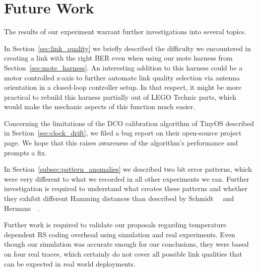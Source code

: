\newpage

\section*{Future Work}

The results of our experiment warrant further investigations into several topics.

In Section~\ref{sec:link_quality} we briefly described the difficulty we encountered in creating a link with the right \ac{BER} even when using our mote harness from Section~\ref{sec:mote_harness}.
An interesting addition to this harness could be a motor controlled z-axis to further automate link quality selection via antenna orientation in a closed-loop controller setup.
In that respect, it might be more practical to rebuild this harness partially out of LEGO Technic parts, which would make the mechanic aspects of this function much easier.

Concerning the limitations of the \ac{DCO} calibration algorithm of TinyOS described in Section~\ref{sec:clock_drift}, we filed a bug report on their open-source project page.
We hope that this raises awareness of the algorithm's performance and prompts a fix.

In Section~\ref{subsec:pattern_anomalies} we described two bit error patterns, which were very different to what we recorded in all other experiments we ran.
Further investigation is required to understand what creates these patterns and whether they exhibit different Hamming distances than described by Schmidt~\etal~\cite{Schmidt2013} and Hermans~\etal~\cite{Hermans2014}.

Further work is required to validate our proposals regarding temperature dependent \ac{RS} coding overhead using simulation and real experiments.
Even though our simulation was accurate enough for our conclusions, they were based on four real traces, which certainly do not cover all possible link qualities that can be expected in real world deployments.




